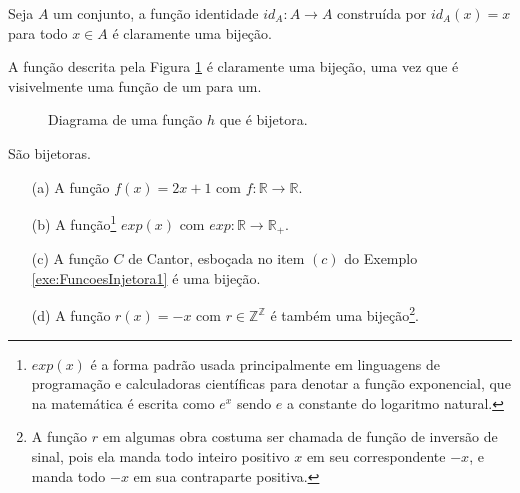 \begin{exemplo}\label{exe:FuncaoIdentidade}
  Seja $A$ um conjunto, a função identidade $id_A : A \rightarrow A$ construída por $id_A(x) = x$ para todo $x \in A$ é claramente uma bijeção.
\end{exemplo}

\begin{exemplo}
  A função descrita pela Figura \ref{fig:FuncaoBijetora1} é claramente uma bijeção, uma vez que é visivelmente uma função de um para um.
\end{exemplo}

\begin{figure}[H]
	\centering
	\caption{Diagrama de uma função $h$ que é bijetora.}
	\label{fig:FuncaoBijetora1}	
\end{figure}

\begin{exemplo}
  São bijetoras.
  \begin{itemize}
    \item[(a)] A função $f(x) = 2x + 1$ com $f: \mathbb{R} \rightarrow \mathbb{R}$.
    \item[(b)] A função\footnote{$exp(x)$ é a forma padrão usada principalmente em linguagens de programação e calculadoras científicas para denotar a função exponencial, que na matemática é escrita como $e^x$ sendo $e$ a constante do logaritmo natural.} $exp(x)$ com $exp: \mathbb{R} \rightarrow \mathbb{R}_+$.
    \item[(c)] A função $C$ de Cantor, esboçada no item $(c)$ do Exemplo \ref{exe:FuncoesInjetora1} é uma bijeção.
    \item[(d)] A função $r(x) = -x$  com $r \in \mathbb{Z}^\mathbb{Z}$ é também uma bijeção\footnote{A função $r$ em algumas obra costuma ser chamada de função de inversão de sinal, pois ela manda todo inteiro positivo $x$ em seu correspondente $-x$, e manda todo $-x$ em sua contraparte positiva.}.
  \end{itemize}
\end{exemplo}


